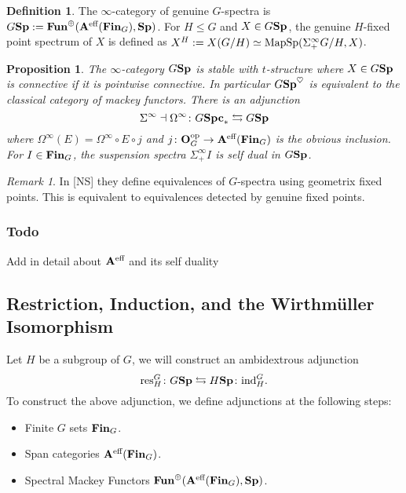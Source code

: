 \documentclass[letterpaper]{article}
\theoremstyle{definition}
\newtheorem{definition}{Definition}[section]
\theoremstyle{remark}
\newtheorem{remark}{Remark}
\theoremstyle{plain}
\newtheorem{prop}{Proposition}
\begin{document}
\begin{definition}
		The $\infty$-category of genuine $G$-spectra is $G\mathbf{Sp} := \mathbf{Fun}^\oplus(\mathbf{A}^\textnormal{eff}(\mathbf{Fin}_G),\mathbf{Sp})$. For $H\leq G$ and $X\in G\mathbf{Sp}$, the genuine $H$-fixed point spectrum of $X$ is defined as $X^H:=X(G/H)\simeq\textnormal{MapSp}(\Sigma^\infty_+ G/H, X)$.
\end{definition}

\begin{prop}
		The $\infty$-category $G\mathbf{Sp}$ is stable with $t$-structure where $X\in G\mathbf{Sp}$ is connective if it is pointwise connective. In particular $G\mathbf{Sp}^\heartsuit$ is equivalent to the classical category of mackey functors. There is an adjunction 
		$$\Sigma^\infty\dashv\Omega^\infty\colon G\mathbf{Spc}_*\leftrightarrows G\mathbf{Sp}$$
		where $\Omega^\infty(E)=\Omega^\infty\circ E\circ j$ and $j\colon\mathbf{O}^{\textnormal{op}}_G\rightarrow\mathbf{A}^\textnormal{eff}(\mathbf{Fin}_G)$ is the obvious inclusion. For $I\in\mathbf{Fin}_G$, the suspension spectra $\Sigma^\infty_+ I$ is self dual in $G\mathbf{Sp}$.
\end{prop}

\begin{remark}
		In [NS] they define equivalences of $G$-spectra using geometrix fixed points. This is equivalent to equivalences detected by genuine fixed points.
\end{remark}

\subsubsection*{Todo}

\begin{outline}
		\1 Add in detail about $\mathbf{A}^\textnormal{eff}$ and its self duality
\end{outline}

\subsection{Restriction, Induction, and the Wirthm\"uller Isomorphism}

Let $H$ be a subgroup of $G$, we will construct an ambidextrous adjunction
$$\textnormal{res}^G_H\colon G\mathbf{Sp}\leftrightarrows H\mathbf{Sp}\colon\textnormal{ind}^G_H.$$
To construct the above adjunction, we define adjunctions at the following steps:
\begin{itemize}
		\item Finite $G$ sets $\mathbf{Fin}_G$.
		\item Span categories $\mathbf{A}^\textnormal{eff}(\mathbf{Fin}_G)$.
		\item Spectral Mackey Functors $\mathbf{Fun}^\oplus(\mathbf{A}^\textnormal{eff}(\mathbf{Fin}_G),\mathbf{Sp})$.
\end{itemize}
\end{document}
